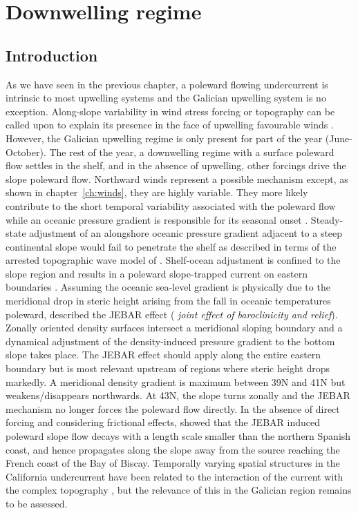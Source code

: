 \chapter{Downwelling regime}\label{ch:winter}

\section{Introduction}
As we have seen in the previous chapter, a poleward flowing
undercurrent is intrinsic to most upwelling systems
\citep{Neshyba89} and the Galician upwelling system is no
exception. Along-slope variability in wind stress forcing or
topography can be called upon to explain its presence in the face
of upwelling favourable winds \citep{Wang97,Trowbridge98}.
However, the Galician upwelling regime is only present for part of
the year (June-October). The rest of the year, a downwelling
regime with a surface poleward flow settles in the shelf, and in
the absence of upwelling, other forcings drive the slope poleward
flow. Northward winds represent a possible mechanism except, as
shown in chapter~\ref{ch:winds}, they are highly variable. They
more likely contribute to the short temporal variability
associated with the poleward flow while an oceanic pressure
gradient is responsible for its seasonal onset
\citep{Frouin90,Haynes90}. Steady-state adjustment of an
alongshore oceanic pressure gradient adjacent to a steep
continental slope would fail to penetrate the shelf \citep{Wang82}
as described in terms of the arrested topographic wave model of
\citet{Csanady78}. Shelf-ocean adjustment is confined to the slope
region and results in a poleward slope-trapped current on eastern
boundaries \citep{Hill98}. Assuming the oceanic sea-level gradient
is physically due to the meridional drop in steric height arising
from the fall in oceanic temperatures poleward,
\citet{Huthnance84,Huthnance95} described the JEBAR effect ({\it
joint effect of baroclinicity and relief}). Zonally oriented
density surfaces intersect a meridional sloping boundary and a
dynamical adjustment of the density-induced pressure gradient to
the bottom slope takes place. The JEBAR effect should apply along
the entire eastern boundary but is most relevant upstream of
regions where steric height drops markedly. A meridional density
gradient is maximum between 39\deg N and 41\deg N \citep{Arhan94}
but weakens/disappears northwards. At 43\deg N, the slope turns
zonally and the JEBAR mechanism no longer forces the poleward flow
directly. In the absence of direct forcing and considering
frictional effects, \citet{Pingree90} showed that the JEBAR
induced poleward slope flow decays with a length scale smaller
than the northern Spanish coast, and hence propagates along the
slope away from the source reaching the French coast of the Bay of
Biscay. Temporally varying spatial structures in the California
undercurrent have been related to the interaction of the current
with the complex topography \citep{Noble00}, but the relevance of
this in the Galician region remains to be assessed.

